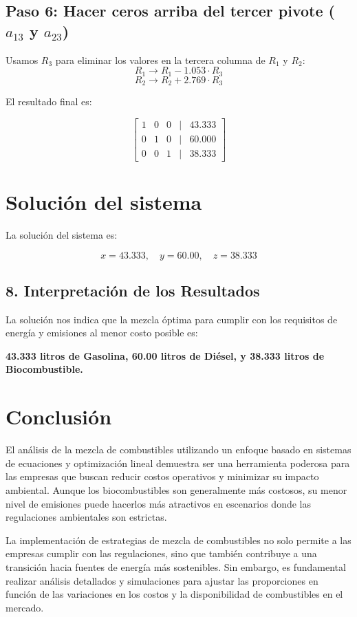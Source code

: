 \documentclass[]{article}
\begin{document}
\subsection*{Paso 6: Hacer ceros arriba del tercer pivote (\(a_{13}\) y \(a_{23}\))}

Usamos \(R_3\) para eliminar los valores en la tercera columna de \(R_1\) y \(R_2\):
\[
R_1 \rightarrow R_1 - 1.053 \cdot R_3
\]
\[
R_2 \rightarrow R_2 + 2.769 \cdot R_3
\]

El resultado final es:

\[
\begin{bmatrix}
	1 & 0 & 0 & | & 43.333 \\
	0 & 1 & 0 & | & 60.000 \\
	0 & 0 & 1 & | & 38.333
\end{bmatrix}
\]

\section*{Solución del sistema}

La solución del sistema es:

\[
x = 43.333, \quad y = 60.00, \quad z = 38.333
\]
	
	\subsection*{8. Interpretación de los Resultados}
	La solución nos indica que la mezcla óptima para cumplir con los requisitos de energía y emisiones al menor costo posible es:
	\begin{center}
		\textbf{43.333 litros de Gasolina, 60.00 litros de Diésel, y 38.333 litros de Biocombustible.}
	\end{center}
	
	\section*{Conclusión}
	El análisis de la mezcla de combustibles utilizando un enfoque basado en sistemas de ecuaciones y optimización lineal demuestra ser una herramienta poderosa para las empresas que buscan reducir costos operativos y minimizar su impacto ambiental. Aunque los biocombustibles son generalmente más costosos, su menor nivel de emisiones puede hacerlos más atractivos en escenarios donde las regulaciones ambientales son estrictas.
	
	La implementación de estrategias de mezcla de combustibles no solo permite a las empresas cumplir con las regulaciones, sino que también contribuye a una transición hacia fuentes de energía más sostenibles. Sin embargo, es fundamental realizar análisis detallados y simulaciones para ajustar las proporciones en función de las variaciones en los costos y la disponibilidad de combustibles en el mercado.
	
\end{document}
